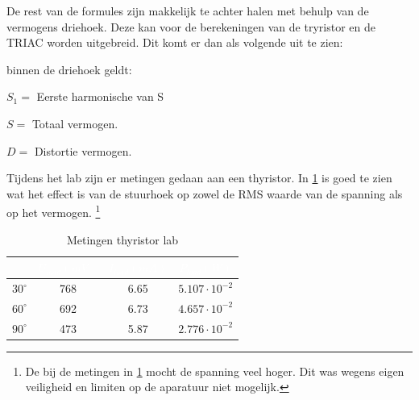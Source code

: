 De rest van de formules zijn makkelijk te achter halen met behulp van de vermogens driehoek. Deze kan voor de berekeningen van de 
tryristor en de TRIAC worden uitgebreid. Dit komt er dan als volgende uit te zien:
\begin{center}

\end{center}

binnen de driehoek geldt: 

$S_1=$ Eerste harmonische van S

$S=$ Totaal vermogen.

$D=$ Distortie vermogen.

Tijdens het lab zijn er metingen gedaan aan een thyristor. In \cref{tab:thyristor}
is goed te zien wat het effect is van de stuurhoek op zowel de RMS waarde van de spanning als op het vermogen.
\footnote{De bij de metingen in \cref{tab:thyristor} mocht de spanning veel hoger. Dit was wegens eigen veiligheid en limiten 
op de aparatuur niet mogelijk.}

\begin{table}
    \begin{center}
    \begin{tabular}{|c|c|c|c|}
        \arrayrulecolor{purple}\hline
	    \rowcolor{purple} 
	    \multicolumn{1}{c}{\textcolor{white}{\textbf{$\alpha$}}} & \multicolumn{1}{c}{\textcolor{white}{\textbf{$U_{load}(mV)$}}} &
        \multicolumn{1}{c}{\textcolor{white}{\textbf{$I_{load}(mA)$}}} & \multicolumn{1}{c}{\textcolor{white}{\textbf{$P_{load}(W)$}}} 
        \\ \hline
            $30^\circ$ & 768 & 6.65 & $5.107\cdot 10^{-2}$ 
            \\ \hline
            $60^\circ$ & 692 & 6.73 & $4.657\cdot 10^{-2}$ 
            \\ \hline
            $90^\circ$ & 473 & 5.87 & $2.776\cdot 10^{-2}$ 
            \\ \hline
    \end{tabular}
    \caption{Metingen thyristor lab}
    \label{tab:thyristor}
    \end{center}
\end{table}

